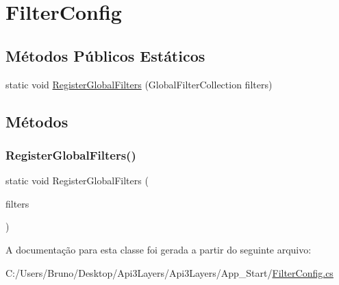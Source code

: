 \hypertarget{classApi3Layers_1_1FilterConfig}{}\section{Filter\+Config}
\label{classApi3Layers_1_1FilterConfig}
\subsection*{Métodos Públicos Estáticos}
\begin{DoxyCompactItemize}
\item 
static void \hyperlink{classApi3Layers_1_1FilterConfig_a25694cee76ca514824bd682cfc9b4ad0}{Register\+Global\+Filters} (Global\+Filter\+Collection filters)
\end{DoxyCompactItemize}


\subsection{Métodos}
\mbox{\label{classApi3Layers_1_1FilterConfig_a25694cee76ca514824bd682cfc9b4ad0}} 
\subsubsection{\texorpdfstring{Register\+Global\+Filters()}{RegisterGlobalFilters()}}
{\footnotesize\ttfamily static void Register\+Global\+Filters (\begin{DoxyParamCaption}\item[{Global\+Filter\+Collection}]{filters }\end{DoxyParamCaption})\hspace{0.3cm}{\ttfamily [static]}}



A documentação para esta classe foi gerada a partir do seguinte arquivo\+:\begin{DoxyCompactItemize}
\item 
C\+:/\+Users/\+Bruno/\+Desktop/\+Api3\+Layers/\+Api3\+Layers/\+App\+\_\+\+Start/\hyperlink{FilterConfig_8cs}{Filter\+Config.\+cs}\end{DoxyCompactItemize}
